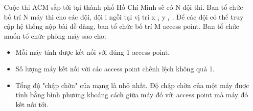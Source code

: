 Cuộc thi ACM sắp tới tại thành phố Hồ Chí Minh sẽ có N đội thi. Ban tổ chức bố trí N máy thi cho các đội, đội i ngồi tại vị trí x $_ i $ y $_ i $ . Để các đội có thể truy cập hệ thống nộp bài dễ dàng, ban tổ chức bố trí M access point. Ban tổ chức muốn tổ chức phòng máy sao cho:
\begin{itemize}
	\item Mỗi máy tính được kết nối với đúng 1 access point.
	\item Số lượng máy kết nối với các access point chênh lệch không quá 1.
	\item Tổng độ "chập chờn" của mạng là nhỏ nhất. Độ chập chờn của một máy được tính bằng bình phương khoảng cách giữa máy đó với access point mà máy đó kết nối tới.
\end{itemize}